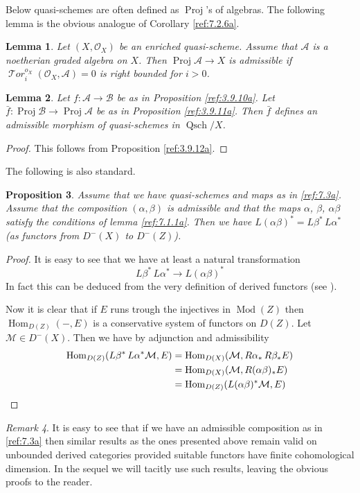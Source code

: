 \documentclass{amsproc}
\def\Ascr{{\mathcal A}}
\def\Bscr{{\mathcal B}}
\def\Mscr{{\mathcal M}}
\def\Oscr{{\mathcal O}}
\def\Tscr{{\mathcal T}}
\def\HTor{\operatorname {\Tscr \mathit{or}}}
\def\Hom{\operatorname {Hom}}
\def\HTor{\operatorname {\Tscr \mathit{or}}}
\def\Qsch{\operatorname {Qsch}}
\def\Proj{\operatorname {Proj}}
\def\Qch{\operatorname {Mod}}
\def\r{\rightarrow}
\newtheorem{lemmas}{Lemma}[subsection]
\newtheorem{propositions}[lemmas]{Proposition}
\theoremstyle{definition}
\theoremstyle{remark}
\newtheorem{remarks}[lemmas]{Remark}
\numberwithin{equation}{section}
\numberwithin{table}{section}
\numberwithin{figure}{section}
\begin{document}
Below quasi-schemes are often defined as $\Proj$'s of algebras. The
following lemma is the obvious analogue of Corollary \ref{ref:7.2.6a}.
\begin{lemmas}
\label{ref:7.2.8a}
  Let $(X,\Oscr_X)$ be an enriched quasi-scheme.  Assume that $\Ascr$
  is a noetherian graded algebra on $X$. Then $\Proj \Ascr \r X$ is
  admissible if $\HTor^{o_X}_i(\Oscr_X,\Ascr)=0$ is right bounded
  for $i>0$.
\end{lemmas}
\begin{lemmas}
\label{ref:7.2.9a}
Let $f:\Ascr\r\Bscr$ be as in Proposition \ref{ref:3.9.10a}. Let
$\bar{f}:\Proj\Bscr\r\Proj\Ascr$ be as in Proposition
\ref{ref:3.9.11a}. Then $\bar{f}$ defines an admissible morphism
of quasi-schemes in $\Qsch/X$.
\end{lemmas}
\begin{proof}
This follows from Proposition \ref{ref:3.9.12a}.
\end{proof}
The following  is also standard.
\begin{propositions} Assume that we have quasi-schemes and maps as in
  \eqref{ref:7.3a}. Assume that the composition $(\alpha,\beta)$ is
  admissible and that the maps $\alpha$, $\beta$, $\alpha\beta$
  satisfy the conditions of lemma \ref{ref:7.1.1a}. Then we have
  $L(\alpha\beta)^\ast= L\beta^\ast\,L\alpha^\ast$ (as functors from
  $D^-(X)$ to $D^-(Z)$).
\end{propositions}
\begin{proof}
It is easy to see that we have at least a natural transformation
\[
L\beta^\ast\,
  L\alpha^\ast\r L(\alpha\beta)^\ast
\]
In fact this can be deduced from the very definition of derived functors
(see \cite[\S5]{RD}).

Now it is clear that if $E$ runs trough the injectives in $\Qch(Z)$
then $\Hom_{D(Z)}(-,E)$ is a conservative system of functors on
$D(Z)$. Let $\Mscr\in D^-(X)$. Then we have by adjunction and admissibility
\begin{align*}
\Hom_{D(Z)}(L\beta^\ast\,
  L\alpha^\ast\Mscr,E)&=\Hom_{D(X)} (\Mscr,R\alpha_\ast\, R\beta_\ast E)\\
&=\Hom_{D(X)}(\Mscr,R(\alpha\beta)_\ast E)\\
&=\Hom_{D(Z)}(L(\alpha\beta)^\ast\Mscr,E)\qed
\end{align*}
\def\qed{}\end{proof}
\begin{remarks} It is easy to see that if we have an admissible
  composition as in \eqref{ref:7.3a} then similar results as the ones
  presented  above remain valid on
  unbounded derived categories provided suitable functors have
  finite cohomological dimension. In the sequel we will tacitly use such results,
  leaving the obvious proofs to the reader.
\end{remarks} 
\end{document}
